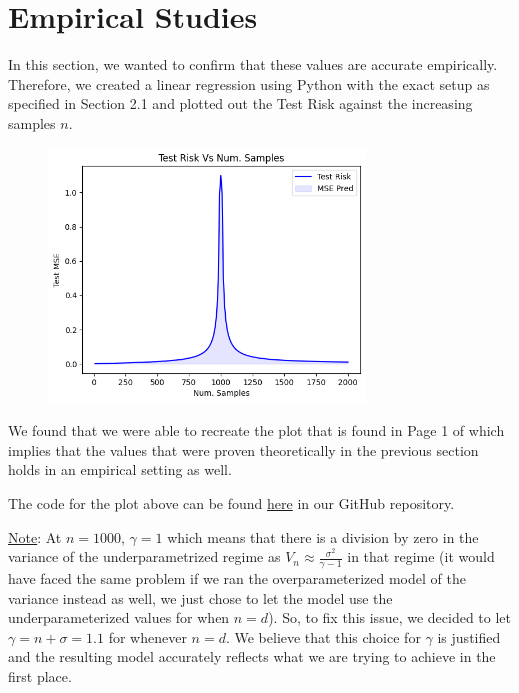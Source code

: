 \documentclass{article}
\begin{document}
\section{Empirical Studies}

In this section, we wanted to confirm that these values are accurate empirically. Therefore, we created a linear regression using Python with the exact setup as specified in Section 2.1 and plotted out the Test Risk against the increasing samples $n$. 

\begin{figure}[h!]
  \centering
  \includegraphics[width=0.75\textwidth, quiet]{graph.png}
\end{figure}

We found that we were able to recreate the plot that is found in Page 1 of \cite{Nakkiran_2019} which implies that the values that were proven theoretically in the previous section holds in an empirical setting as well.

The code for the plot above can be found \href{https://github.com/ShawnGeorge03/STAD80-Review_Of_Double_Descent}{here} in our GitHub repository.

\underline{Note}: At $n=1000$, $\gamma = 1$ which means that there is a division by zero in the variance of the underparametrized regime as $V_n \approx \frac{\sigma^2}{\gamma - 1}$ in that regime (it would have faced the same problem if we ran the overparameterized model of the variance instead as well, we just chose to let the model use the underparameterized values for when $n=d$). So, to fix this issue, we decided to let $\gamma = n + \sigma = 1.1$ for whenever $n=d$. We believe that this choice for $\gamma$ is justified and the resulting model accurately reflects what we are trying to achieve in the first place.
\end{document}
